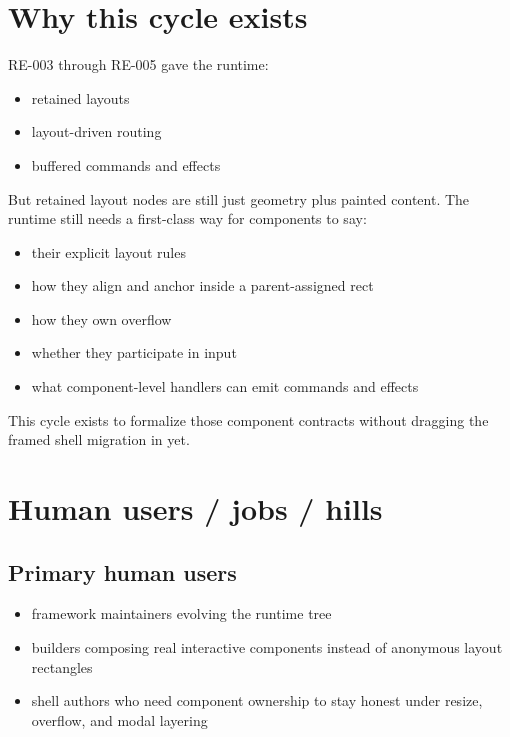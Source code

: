 \section{Why this cycle exists}\label{record-154-why-this-cycle-exists}

RE-003 through RE-005 gave the runtime:

\begin{itemize}
\tightlist
\item
  retained layouts
\item
  layout-driven routing
\item
  buffered commands and effects
\end{itemize}

But retained layout nodes are still just geometry plus painted content. The runtime still needs a first-class way for components to say:

\begin{itemize}
\tightlist
\item
  their explicit layout rules
\item
  how they align and anchor inside a parent-assigned rect
\item
  how they own overflow
\item
  whether they participate in input
\item
  what component-level handlers can emit commands and effects
\end{itemize}

This cycle exists to formalize those component contracts without dragging the framed shell migration in yet.

\section{Human users / jobs / hills}\label{record-154-human-users-jobs-hills}

\subsection{Primary human users}\label{record-154-primary-human-users}

\begin{itemize}
\tightlist
\item
  framework maintainers evolving the runtime tree
\item
  builders composing real interactive components instead of anonymous layout rectangles
\item
  shell authors who need component ownership to stay honest under resize, overflow, and modal layering
\end{itemize}

